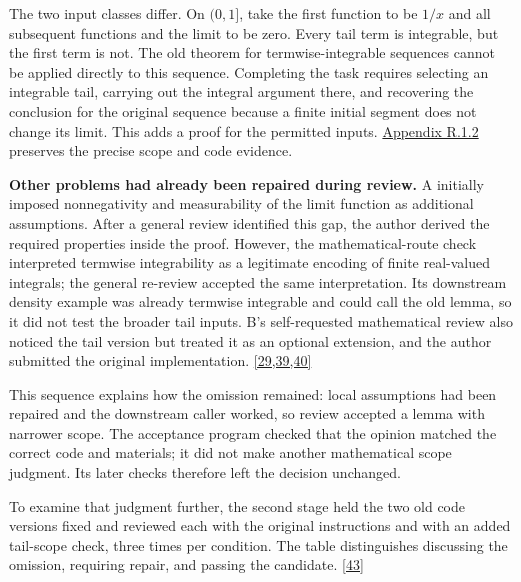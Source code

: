 The two input classes differ. On $(0,1]$, take the first function to be $1/x$ and all subsequent functions and the limit to be zero. Every tail term is integrable, but the first term is not. The old theorem for termwise-integrable sequences cannot be applied directly to this sequence. Completing the task requires selecting an integrable tail, carrying out the integral argument there, and recovering the conclusion for the original sequence because a finite initial segment does not change its limit. This adds a proof for the permitted inputs. \href{en-appendix.pdf\#r1-2}{Appendix R.1.2} preserves the precise scope and code evidence.

\textbf{Other problems had already been repaired during review.} A initially imposed nonnegativity and measurability of the limit function as additional assumptions. After a general review identified this gap, the author derived the required properties inside the proof. However, the mathematical-route check interpreted termwise integrability as a legitimate encoding of finite real-valued integrals; the general re-review accepted the same interpretation. Its downstream density example was already termwise integrable and could call the old lemma, so it did not test the broader tail inputs. B's self-requested mathematical review also noticed the tail version but treated it as an optional extension, and the author submitted the original implementation. \hyperlink{ref-29}{\mbox{[29,39,40]}}

This sequence explains how the omission remained: local assumptions had been repaired and the downstream caller worked, so review accepted a lemma with narrower scope. The acceptance program checked that the opinion matched the correct code and materials; it did not make another mathematical scope judgment. Its later checks therefore left the decision unchanged.

To examine that judgment further, the second stage held the two old code versions fixed and reviewed each with the original instructions and with an added tail-scope check, three times per condition. The table distinguishes discussing the omission, requiring repair, and passing the candidate. \hyperlink{ref-43}{\mbox{[43]}}

